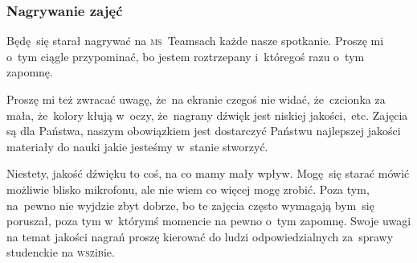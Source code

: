 \documentclass[10pt,t]{beamer}
\begin{document}
\begin{frame}
  \frametitle{Nagrywanie zajęć}


  Będę~się starał nagrywać na \textsc{ms}~Teamsach każde nasze spotkanie.
  Proszę mi o~tym ciągle przypominać, bo jestem roztrzepany i~któregoś
  razu o~tym zapomnę.

  Proszę mi też zwracać uwagę, że~na ekranie czegoś nie widać,
  że~czcionka za mała, że~kolory kłują w~oczy, że~nagrany dźwięk
  jest niskiej jakości,~etc. Zajęcia są dla Państwa, naszym obowiązkiem jest
  dostarczyć Państwu najlepszej jakości materiały do nauki jakie jesteśmy
  w~stanie stworzyć.

  Niestety, jakość dźwięku to coś, na co mamy mały wpływ. Mogę~się starać
  mówić możliwie blisko mikrofonu, ale nie wiem co więcej mogę zrobić.
  Poza tym, na~pewno nie wyjdzie zbyt dobrze, bo te zajęcia często wymagają
  bym~się poruszał, poza tym w~którymś momencie na pewno o~tym zapomnę.
  Swoje uwagi na temat jakości nagrań proszę kierować do ludzi
  odpowiedzialnych za~sprawy studenckie na \textsc{wsz}i\textsc{b}ie.

\end{frame}
\end{document}
